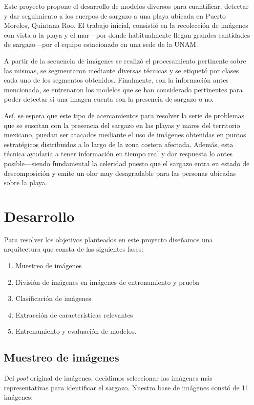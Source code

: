 \documentclass[conference]{IEEEtran}
\begin{document}
Este proyecto propone el desarrollo de modelos diversos para cuantificar, detectar y dar seguimiento a los cuerpos de sargazo a una playa ubicada en Puerto Morelos, Quintana Roo. El trabajo inicial, consistió en la recolección de imágenes con vista a la playa y el mar---por donde habitualmente llegan grandes cantidades de sargazo---por el equipo estacionado en una sede de la UNAM.

A partir de la secuencia de imágenes se realizó el procesamiento pertinente sobre las mismas, se segmentaron mediante diversas técnicas y se etiquetó por clases cada uno de los segmentos obtenidos. Finalmente, con la información antes mencionada, se entrenaron los modelos que se han considerado pertinentes para poder detectar si una imagen cuenta con la presencia de sargazo o no.

Así, se espera que este tipo de acercamientos para resolver la serie de problemas que se suscitan con la presencia del sargazo en las playas y mares del territorio mexicano, puedan ser atacados mediante el uso de imágenes obtenidas en puntos estratégicos distribuidos a lo largo de la zona costera afectada. Además, esta técnica ayudaría a tener información en tiempo real y dar respuesta lo antes posible---siendo fundamental la celeridad puesto que el sargazo entra en estado de descomposición y emite un olor muy desagradable para las personas ubicadas sobre la playa.

\section{Desarrollo}
Para resolver los objetivos planteados en este proyecto diseñamos una arquitectura que consta de las siguientes fases:

\begin{enumerate}
    \item Muestreo de imágenes
    \item División de imágenes en imágenes de entrenamiento y prueba
    \item Clasificación de imágenes
    \item Extracción de características relevantes
    \item Entrenamiento y evaluación de modelos.
\end{enumerate}

\subsection{Muestreo de imágenes}
Del \textit{pool} original de imágenes, decidimos seleccionar las imágenes más representativas para identificar el sargazo. Nuestro base de imágenes constó de 11 imágenes: 
\end{document}
